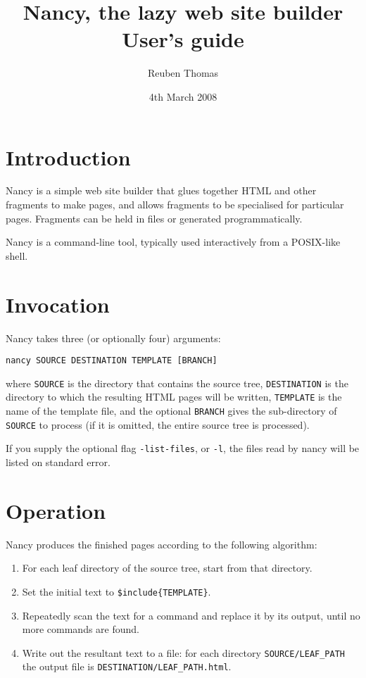 \documentclass[english]{scrartcl}
\begin{document}
\title{Nancy, the lazy web site builder\\User's guide}
\date{4th March 2008}
\author{Reuben Thomas}
\maketitle

\section{Introduction}

Nancy is a simple web site builder that glues together HTML and other fragments to make pages, and allows fragments to be specialised for particular pages. Fragments can be held in files or generated programmatically.

Nancy is a command-line tool, typically used interactively from a POSIX-like shell.

\section{Invocation}

Nancy takes three (or optionally four) arguments:

\begin{verbatim}
nancy SOURCE DESTINATION TEMPLATE [BRANCH]
\end{verbatim}

\noindent where \verb|SOURCE| is the directory that contains the source tree, \verb|DESTINATION| is the directory to which the resulting HTML pages will be written, \verb|TEMPLATE| is the name of the template file, and the optional \verb|BRANCH| gives the sub-directory of \verb|SOURCE| to process (if it is omitted, the entire source tree is processed).

If you supply the optional flag \verb|-list-files|, or \verb|-l|, the files read by nancy will be listed on standard error.

\section{Operation}
\label{operation}

Nancy produces the finished pages according to the following algorithm:

\begin{enumerate}
\item For each leaf directory of the source tree, start from that directory.
\item Set the initial text to \verb|$include{TEMPLATE}|.
\item Repeatedly scan the text for a command and replace it by its output, until no more commands are found.
\item Write out the resultant text to a file: for each directory \verb|SOURCE/LEAF_PATH| the output file is \verb|DESTINATION/LEAF_PATH.html|.
\end{enumerate}
\end{document}
